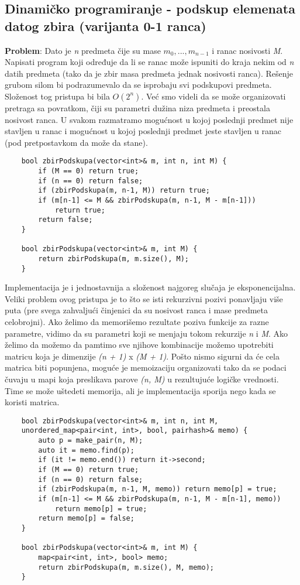\documentclass{article}
\begin{document}
\subsection{Dinamičko programiranje - podskup elemenata datog zbira (varijanta 0-1 ranca)}
\textbf{Problem}: Dato je \textit{n} predmeta čije su mase 
$m_0,..., m_{n-1}$ i ranac nosivosti \textit{M}. Napisati program koji određuje da li se ranac može
ispuniti do kraja nekim od \textit{n} datih predmeta (tako da je zbir masa predmeta
jednak nosivosti ranca).
\newline
Rešenje grubom silom bi podrazumevalo da se isprobaju svi podskupovi predmeta. Složenost tog pristupa bi bila $O(2^n)$. Već smo videli da se može organizovati pretraga sa povratkom, čiji su parametri
dužina niza predmeta i preostala nosivost ranca. U svakom razmatramo
mogućnost u kojoj poslednji predmet nije stavljen u ranac i mogućnost u kojoj
poslednji predmet jeste stavljen u ranac (pod pretpostavkom da može da stane).
\begin{lstlisting}
    bool zbirPodskupa(vector<int>& m, int n, int M) {
        if (M == 0) return true;
        if (n == 0) return false;
        if (zbirPodskupa(m, n-1, M)) return true;
        if (m[n-1] <= M && zbirPodskupa(m, n-1, M - m[n-1]))
            return true;
        return false;
    }

    bool zbirPodskupa(vector<int>& m, int M) {
        return zbirPodskupa(m, m.size(), M);
    }
\end{lstlisting}
Implementacija je i jednostavnija a složenost najgoreg slučaja je eksponencijalna. Veliki problem ovog pristupa je to što se isti rekurzivni pozivi ponavljaju više puta
(pre svega zahvaljući činjenici da su nosivost ranca i mase predmeta celobrojni).
\newline
Ako želimo da memorišemo rezultate poziva funkcije za razne parametre, vidimo
da su parametri koji se menjaju tokom rekurzije \textit{n} i \textit{M}. Ako želimo da možemo da
pamtimo sve njihove kombinacije možemo upotrebiti matricu koja je dimenzije
\textit{(n + 1)} x \textit{(M + 1)}.
Pošto nismo sigurni da će cela matrica biti popunjena, moguće je memoizaciju
organizovati tako da se podaci čuvaju u mapi koja preslikava parove \textit{(n, M)} u
rezultujuće logičke vrednosti. Time se može uštedeti memorija, ali je implementacija sporija nego kada se koristi matrica.
\begin{lstlisting}
    bool zbirPodskupa(vector<int>& m, int n, int M,
    unordered_map<pair<int, int>, bool, pairhash>& memo) {
        auto p = make_pair(n, M);
        auto it = memo.find(p);
        if (it != memo.end()) return it->second;
        if (M == 0) return true;
        if (n == 0) return false;
        if (zbirPodskupa(m, n-1, M, memo)) return memo[p] = true;
        if (m[n-1] <= M && zbirPodskupa(m, n-1, M - m[n-1], memo))
            return memo[p] = true;
        return memo[p] = false;
    }

    bool zbirPodskupa(vector<int>& m, int M) {
        map<pair<int, int>, bool> memo;
        return zbirPodskupa(m, m.size(), M, memo);
    }
\end{lstlisting}
\end{document}
